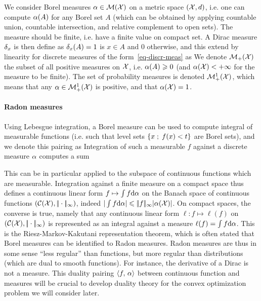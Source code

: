 We consider Borel measures $\alpha \in \mathcal{M}(\mathcal{X})$ on a metric space $(\mathcal{X},d)$, i.e. one can compute $\alpha(A)$ for any Borel set $A$ (which can be obtained by applying countable union, countable intersection, and relative complement to open sets). The measure should be finite, i.e. have a finite value on compact set.
%
A Dirac measure $\delta_x$ is then define as $\delta_x(A)=1$ is $x \in A$ and $0$ otherwise, and this extend by linearity for discrete measures of the form~\eqref{eq-discr-meas} as
%
We denote $\mathcal{M}_+(\mathcal{X})$ the subset of all positive measures on $\mathcal{X}$, i.e. $\alpha(A) \geqslant 0$ (and $\alpha(\mathcal{X})<+\infty$ for the measure to be finite). The set of probability measures is denoted $\mathcal{M}_+^1(\mathcal{X})$, which means that any $\alpha \in \mathcal{M}_+^1(\mathcal{X})$ is positive, and that $\alpha(\mathcal{X})=1$. 


\paragraph{Radon measures}

Using Lebesgue integration, a Borel measure can be used to compute integral of measurable functions (i.e. such that level sets $\left\{ x \;;\; f(x) < t \right\}$ are Borel sets), and we denote this pairing as
Integration of such a measurable $f$ against a discrete measure $\alpha$ computes a sum

 
This can be in particular applied to the subspace of continuous functions which are measurable.
%
Integration against a finite measure on a compact space thus defines a continuous linear form $f \mapsto \int f \mathrm{d}\alpha$ on the Banach space of continuous functions $(\mathcal{C}(\mathcal{X}),|\!| \cdot |\!|_\infty)$, indeed $|\int f \mathrm{d}\alpha| \leqslant |\!| f |\!|_\infty |\alpha(\mathcal{X})|$. 
%
On compact spaces, the converse is true, namely that any continuous linear form $\ell : f \mapsto \ell(f)$ on $(\mathcal{C}(\mathcal{X}),|\!| \cdot |\!|_\infty)$ is represented as an integral against a measure $\ell(f)=\int f \mathrm{d} \alpha$. This is the  Riesz-Markov-Kakutani representation theorem, which is often stated that Borel measures can be identified to Radon measures.
%
Radon measures are thus in some sense ``less regular'' than functions, but more regular than distributions (which are dual to smooth functions). For instance, the derivative of a Dirac is not a measure.
%
This duality pairing $\langle f,\,\alpha\rangle$ between continuous function and measures will be crucial to develop duality theory for the convex optimization problem we will consider later. 

